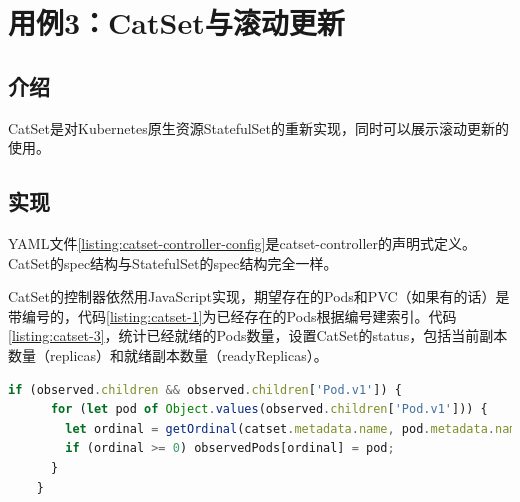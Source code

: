 \documentclass[macfonts,master]{njuthesis}
\begin{document}
\section{用例3：CatSet与滚动更新}\label{section:catset}
\subsection{介绍}
CatSet是对Kubernetes原生资源StatefulSet的重新实现，同时可以展示滚动更新的使用。
\subsection{实现}

YAML文件\ref{listing:catset-controller-config}是catset-controller的声明式定义。CatSet的spec结构与StatefulSet的spec结构完全一样。



CatSet的控制器依然用JavaScript实现，期望存在的Pods和PVC（如果有的话）是带编号的，代码\ref{listing:catset-1}为已经存在的Pods根据编号建索引。代码\ref{listing:catset-3}，统计已经就绪的Pods数量，设置CatSet的status，包括当前副本数量（replicas）和就绪副本数量（readyReplicas）。

\begin{lstlisting}[language=JavaScript,caption=为已存在的Pods建索引,label=listing:catset-1,gobble=4]
    if (observed.children && observed.children['Pod.v1']) {
      for (let pod of Object.values(observed.children['Pod.v1'])) {
        let ordinal = getOrdinal(catset.metadata.name, pod.metadata.name);
        if (ordinal >= 0) observedPods[ordinal] = pod;
      }
    }
\end{lstlisting}
\end{document}
